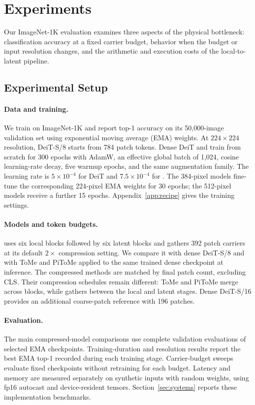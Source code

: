 \section{Experiments}
\label{sec:experiments}
\label{sec:setup}

Our ImageNet-1K evaluation examines three aspects of the physical bottleneck:
classification accuracy at a fixed carrier budget, behavior when the budget
or input resolution changes, and the arithmetic and execution costs of the
local-to-latent pipeline.

\subsection{Experimental Setup}

\paragraph{Data and training.}
We train on ImageNet-1K and report top-1 accuracy on its 50,000-image
validation set using exponential moving average (EMA) weights.
At $224\times224$ resolution, DeiT-S/8 starts from 784 patch tokens.
Dense DeiT and \mn{} train from scratch for 300 epochs with AdamW,
an effective global batch of 1,024, cosine learning-rate decay,
five warmup epochs, and the same augmentation family. The learning rate
is $5\times10^{-4}$ for DeiT and $7.5\times10^{-4}$ for \mn{}.
The 384-pixel models fine-tune the corresponding 224-pixel EMA weights
for 30 epochs; the 512-pixel models receive a further 15 epochs.
Appendix~\ref{app:recipe} gives the training settings.

\paragraph{Models and token budgets.}
\mn{} uses six local blocks followed by six latent blocks and gathers
392 patch carriers at its default $2\times$ compression setting.
We compare it with dense DeiT-S/8 and with ToMe and PiToMe applied to the
same trained dense checkpoint at inference. The compressed methods are
matched by final patch count, excluding CLS. Their compression schedules
remain different: ToMe and PiToMe merge across blocks, while \mn{}
gathers between the local and latent stages. Dense DeiT-S/16 provides
an additional coarse-patch reference with 196 patches.

\paragraph{Evaluation.}
The main compressed-model comparisons use complete validation evaluations
of selected EMA checkpoints. Training-duration and resolution results
report the best EMA top-1 recorded during each training stage. Carrier-budget
sweeps evaluate fixed checkpoints without retraining for each budget.
Latency and memory are measured separately on synthetic inputs with random
weights, using fp16 autocast and device-resident tensors.
Section~\ref{sec:systems} reports these implementation benchmarks.
